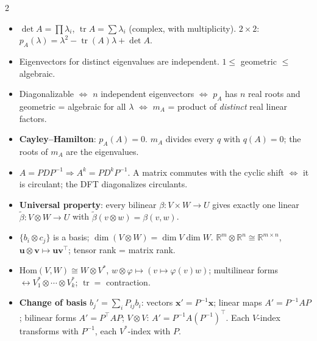 \documentclass[10pt]{article}
\DeclareMathOperator{\tr}{tr}
\newcommand{\topic}[1]{\par\smallskip\noindent{\color{blue!50!black}\textbf{#1}}\par}
\begin{document}
\begin{multicols}{2}
\topic{Eigenvalues}
\begin{itemize}
    \item $\det A = \prod\lambda_i$, $\tr A = \sum\lambda_i$ (complex, with multiplicity). $2 \times 2$: $p_A(\lambda) = \lambda^2 - \tr(A)\lambda + \det A$.
    \item Eigenvectors for distinct eigenvalues are independent. $1 \leq$ geometric $\leq$ algebraic.
    \item Diagonalizable $\iff$ $n$ independent eigenvectors $\iff$ $p_A$ has $n$ real roots and geometric = algebraic for all $\lambda$ $\iff$ $m_A$ = product of \emph{distinct} real linear factors.
    \item \textbf{Cayley--Hamilton}: $p_A(A) = 0$. $m_A$ divides every $q$ with $q(A) = 0$; the roots of $m_A$ are the eigenvalues.
    \item $A = PDP^{-1} \Rightarrow A^k = PD^kP^{-1}$. A matrix commutes with the cyclic shift $\iff$ it is circulant; the DFT diagonalizes circulants.
\end{itemize}

\topic{Tensors}
\begin{itemize}
    \item \textbf{Universal property}: every bilinear $\beta: V \times W \to U$ gives exactly one linear $\tilde\beta: V \otimes W \to U$ with $\tilde\beta(v \otimes w) = \beta(v, w)$.
    \item $\{b_i \otimes c_j\}$ is a basis; $\dim(V \otimes W) = \dim V\dim W$. $\mathbb{R}^m \otimes \mathbb{R}^n \cong \mathbb{R}^{m \times n}$, $\mathbf{u} \otimes \mathbf{v} \mapsto \mathbf{u}\mathbf{v}^\top$; tensor rank = matrix rank.
    \item $\mathrm{Hom}(V, W) \cong W \otimes V^*$, $w \otimes \varphi \mapsto (v \mapsto \varphi(v)w)$; multilinear forms $\leftrightarrow V_1^* \otimes \cdots \otimes V_k^*$; $\tr = $ contraction.
    \item \textbf{Change of basis} $b_j' = \sum_i P_{ij}b_i$: vectors $\mathbf{x}' = P^{-1}\mathbf{x}$; linear maps $A' = P^{-1}AP$; bilinear forms $A' = P^\top AP$; $V \otimes V$: $A' = P^{-1}A(P^{-1})^\top$. Each $V$-index transforms with $P^{-1}$, each $V^*$-index with $P$.
\end{itemize}


\end{multicols}
\end{document}
